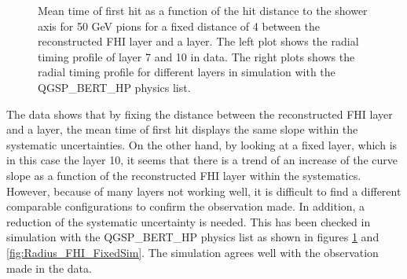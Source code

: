\begin{figure}[htbp!]
\begin{subfigure}[t]{0.5\textwidth}
		\caption{}\label{fig:Radius_FHISim1}
	\end{subfigure}
	\caption{Mean time of first hit as a function of the hit distance to the shower axis for 50 GeV pions for a fixed distance of 4 between the reconstructed FHI layer and a layer. The left plot shows the radial timing profile of layer 7 and 10 in data. The right plots shows the radial timing profile for different layers in simulation with the QGSP\_BERT\_HP physics list.}
	\label{fig:Radius_FHIAll}
\end{figure}

The data shows that by fixing the distance between the reconstructed FHI layer and a layer, the mean time of first hit displays the same slope within the systematic uncertainties. On the other hand, by looking at a fixed layer, which is in this case the layer 10, it seems that there is a trend of an increase of the curve slope as a function of the reconstructed FHI layer within the systematics. However, because of many layers not working well, it is difficult to find a different comparable configurations to confirm the observation made. In addition, a reduction of the systematic uncertainty is needed. This has been checked in simulation with the QGSP\_BERT\_HP physics list as shown in figures \ref{fig:Radius_FHISim1} and \ref{fig:Radius_FHI_FixedSim}. The simulation agrees well with the observation made in the data.

